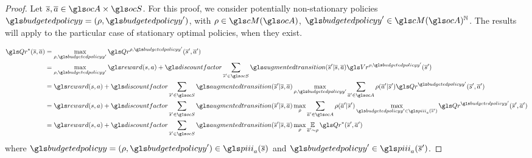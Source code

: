 \subsection{}
\label{proof-thm:bellman-optimality}

\begin{proof}
    Let $\os, \oa \in \ocA\times\ocS$. For this proof, we consider potentially non-stationary policies $\budgetedpolicy=(\rho, \budgetedpolicy')$, with $\rho\in\cM(\ocA)$, $\budgetedpolicy'\in\cM(\ocA)^\Natural$. The results will apply to the particular case of stationary optimal policies, when they exist.

    \begin{align}
        \Qr^*(\os, \oa) &=  \max_{\rho, \budgetedpolicy'} \Qr^{\rho, \budgetedpolicy'}(\os', \oa') \label{eq:pthm_def}\\
        &= \max_{\rho, \budgetedpolicy'} \reward(s, a) + \discountfactor \sum_{\os'\in\ocS} \augmentedtransition(\os' | \os, \oa) \Vr^{\rho, \budgetedpolicy'}(\os') \label{eq:pthm_exp}\\
        &= \reward(s, a) + \discountfactor \sum_{\os'\in\ocS}  \augmentedtransition(\os' | \os, \oa) \max_{\rho, \budgetedpolicy'} \sum_{\oa'\in\ocA} \rho(\oa' | \os')\Qr^{\budgetedpolicy'}(\os', \oa') \label{eq:pthm_marg}\\
        &= \reward(s, a) + \discountfactor \sum_{\os'\in\ocS}  \augmentedtransition(\os' | \os, \oa) \max_\rho\sum_{\oa'\in\ocA}\rho(\oa' | \os')\max_{\budgetedpolicy'\in\policies_a(\os')}\Qr^{\budgetedpolicy'}(\os', \oa') \label{eq:pthm_max}\\
        &= \reward(s, a) + \discountfactor \sum_{\os'\in\ocS}  \augmentedtransition(\os' | \os, \oa) \max_\rho\expectedvalueover{\oa'\sim\rho}\Qr^*(\os', \oa') \label{eq:pthm_marg_def2}
    \end{align}
    where $\budgetedpolicy = (\rho, \budgetedpolicy')\in\policies_a(\os)$ and $\budgetedpolicy'\in\policies_a(\os')$.


\end{proof}
